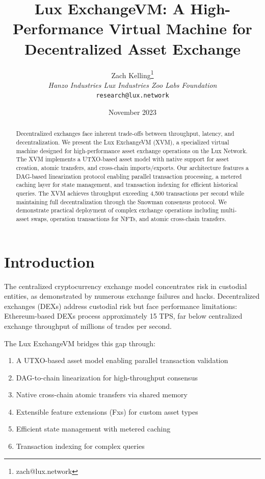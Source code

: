 \documentclass[11pt,a4paper]{article}
\title{\textbf{Lux ExchangeVM: A High-Performance Virtual Machine for Decentralized Asset Exchange}}
\author{Zach Kelling\thanks{zach@lux.network} \\ \textit{Hanzo Industries \quad Lux Industries \quad Zoo Labs Foundation} \\ \texttt{research@lux.network}}
\date{November 2023}
\begin{document}
\maketitle

\begin{abstract}
Decentralized exchanges face inherent trade-offs between throughput, latency, and decentralization. We present the Lux ExchangeVM (XVM), a specialized virtual machine designed for high-performance asset exchange operations on the Lux Network. The XVM implements a UTXO-based asset model with native support for asset creation, atomic transfers, and cross-chain imports/exports. Our architecture features a DAG-based linearization protocol enabling parallel transaction processing, a metered caching layer for state management, and transaction indexing for efficient historical queries. The XVM achieves throughput exceeding 4,500 transactions per second while maintaining full decentralization through the Snowman consensus protocol. We demonstrate practical deployment of complex exchange operations including multi-asset swaps, operation transactions for NFTs, and atomic cross-chain transfers.
\end{abstract}

\section{Introduction}

The centralized cryptocurrency exchange model concentrates risk in custodial entities, as demonstrated by numerous exchange failures and hacks. Decentralized exchanges (DEXs) address custodial risk but face performance limitations: Ethereum-based DEXs process approximately 15 TPS, far below centralized exchange throughput of millions of trades per second.

The Lux ExchangeVM bridges this gap through:

\begin{enumerate}
    \item A UTXO-based asset model enabling parallel transaction validation
    \item DAG-to-chain linearization for high-throughput consensus
    \item Native cross-chain atomic transfers via shared memory
    \item Extensible feature extensions (Fxs) for custom asset types
    \item Efficient state management with metered caching
    \item Transaction indexing for complex queries
\end{enumerate}
\end{document}
